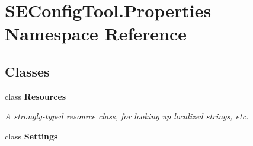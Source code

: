 \hypertarget{namespace_s_e_config_tool_1_1_properties}{}\section{S\+E\+Config\+Tool.\+Properties Namespace Reference}
\label{namespace_s_e_config_tool_1_1_properties}
\subsection*{Classes}
\begin{DoxyCompactItemize}
\item 
class {\bfseries Resources}
\begin{DoxyCompactList}\small\item\em A strongly-\/typed resource class, for looking up localized strings, etc. \end{DoxyCompactList}\item 
class {\bfseries Settings}
\end{DoxyCompactItemize}
